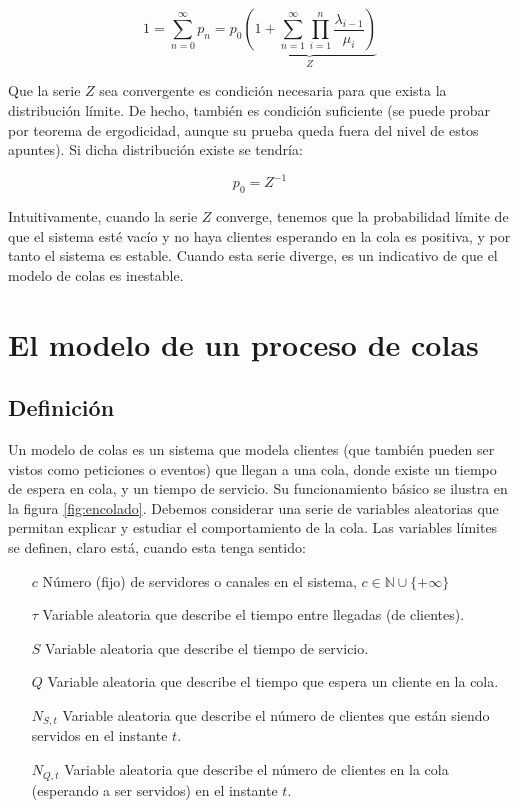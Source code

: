 \documentclass[a4paper,10pt]{scrartcl}
\theoremstyle{definition}
\theoremstyle{definition}
\numberwithin{equation}{section}
\begin{document}
	\begin{equation}
	1 = \sum_{n=0}^{\infty} p_n = p_0 \underbrace{\left(1 + \sum_{n=1}^{\infty} \prod_{i=1}^n \frac{\lambda_{i-1}}{\mu_i} \right)}_{Z}
	\label{eq:stabseries}
	\end{equation}
	
	Que la serie $Z$ sea convergente es condición necesaria para que exista la distribución límite. 
	De hecho, también es condición suficiente (se puede probar por teorema de ergodicidad, aunque su prueba queda
	fuera del nivel de estos apuntes). Si dicha distribución existe se tendría: 
	
	\begin{equation}
	p_0 = Z^{-1} 
	\label{eq:relp0}
	\end{equation}
	
	Intuitivamente, cuando la serie $Z$ converge, tenemos que la probabilidad límite de que el 
	sistema esté vacío y no haya clientes esperando en la cola es positiva, y por tanto el sistema 
        es estable. Cuando esta serie diverge, es un indicativo de que el modelo de colas
	es inestable.
	
	
	\section{El modelo de un proceso de colas}
	\subsection{Definición}
	Un modelo de colas es un sistema que modela clientes (que también pueden ser vistos como peticiones o eventos) que llegan a una cola,
	donde existe un tiempo de espera en cola, y un tiempo de servicio. Su funcionamiento básico se 
	ilustra en la figura \ref{fig:encolado}. Debemos considerar una serie de variables aleatorias que permitan
	explicar y estudiar el comportamiento de la cola. Las variables límites se definen, claro está, cuando esta 
	tenga sentido:
	
	\begin{itemize}
		\item [$c$]
		Número (fijo) de servidores o canales en el sistema, $c\in \mathbb{N} \cup \{+\infty\}$
		\item [$\tau$]
		Variable aleatoria que describe el tiempo entre llegadas (de clientes).
		\item [$S$]
		Variable aleatoria que describe el tiempo de servicio.
		\item [$Q$]
		Variable aleatoria que describe el tiempo que espera un cliente en la cola.
		\item [$N_{S,t}$]
		Variable aleatoria que describe el número de clientes que están siendo servidos en el instante $t$.
		\item [$N_{Q,t}$]
		Variable aleatoria que describe el número de clientes en la cola (esperando a ser servidos) en el instante $t$.
	\end{itemize}
	
\end{document}
